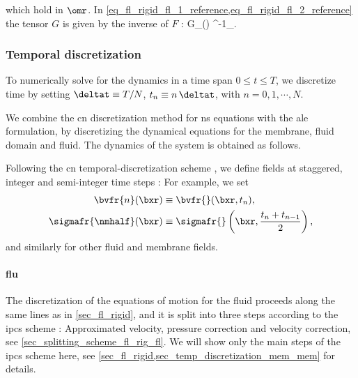 which hold in $\omr$. In \cref{eq_fl_rigid_fl_1_reference,eq_fl_rigid_fl_2_reference} the tensor $G$ is given by the inverse of $F$ \cite{kamenskyLectureNotesMAE}:
\be
\label{eq_def_G}
G_{\alpha \beta}(\bu) \equiv [F(\bu)]^{-1}_{\alpha \beta}.
\ee\vspace{5mm}



\subsubsection{Temporal discretization}\label{sec_temp_discretization_mem}

To numerically solve for the dynamics in a time span $0 \leq t \leq T$, we discretize time by setting $\deltat \equiv T/N$, $t_n \equiv n\, \deltat$, with $n = 0, 1, \cdots, N$.

We combine the \ac{cn} discretization method for \ac{ns} equations \cite{loggAutomatedSolutionDifferential2012,crankPracticalMethodNumerical1947} with the \ac{ale} formulation, by discretizing the dynamical equations for the membrane, fluid domain and  fluid.
The  dynamics of the system is obtained as follows.\\ \vspace{5mm}




Following the \ac{cn} temporal-discretization scheme \cite{crankPracticalMethodNumerical1947}, we define fields at staggered,  integer and semi-integer time steps  \cite{loggAutomatedSolutionDifferential2012}: For example, we set
\begin{align}
    \label{eq_time_step_1}
    \bvfr{n}(\bxr)          & \equiv \bvfr{}(\bxr, t_n)  ,                               \\
    \label{eq_time_step_2}
    \sigmafr{\nmhalf}(\bxr) & \equiv \sigmafr{}\left(\bxr, \frac{t_n+t_{n-1}}{2}\right),
\end{align}
and similarly for other fluid and membrane fields.


\paragraph{\Acl{flu}}\label{sec_temp_discretization_mem_bflu}


The discretization of the equations of motion for  the fluid proceeds along the same lines as in \cref{sec_fl_rigid}, and it is split into three steps according to the \ac{ipcs} scheme \cite{loggAutomatedSolutionDifferential2012,chorinNumericalSolutionNavierStokes1968}: Approximated velocity, pressure correction and velocity correction, see \cref{sec_splitting_scheme_fl_rig_fl}. We will show only the main steps of the \ac{ipcs} scheme here, see \cref{sec_fl_rigid,sec_temp_discretization_mem_mem} for details.



